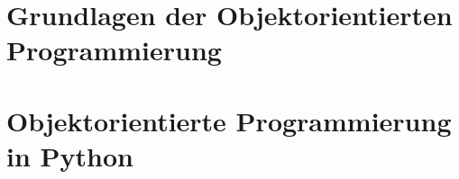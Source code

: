 \newcommand{\decktitle}{Objektorientierte Programmierung}

%
%


		
\section{Grundlagen der Objektorientierten Programmierung}


\section{Objektorientierte Programmierung in Python}